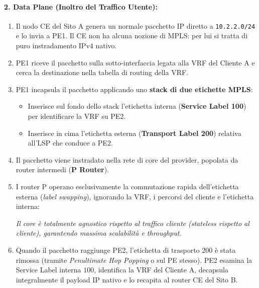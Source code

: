 \documentclass[11pt, a4paper]{article}
\begin{document}
\paragraph{2. Data Plane (Inoltro del Traffico Utente):}
\begin{enumerate}
    \item Il nodo CE del Sito A genera un normale pacchetto IP diretto a \texttt{10.2.2.0/24} e lo invia a PE1. Il CE non ha alcuna nozione di MPLS: per lui si tratta di puro instradamento IPv4 nativo.
    \item PE1 riceve il pacchetto sulla sotto-interfaccia legata alla VRF del Cliente A e cerca la destinazione nella tabella di routing della VRF.
    \item PE1 incapsula il pacchetto applicando uno \textbf{stack di due etichette MPLS}:
    \begin{itemize}[noitemsep]
        \item Inserisce sul fondo dello stack l'etichetta interna (\textbf{Service Label 100}) per identificare la VRF su PE2.
        \item Inserisce in cima l'etichetta esterna (\textbf{Transport Label 200}) relativa all'LSP che conduce a PE2.
    \end{itemize}
    \item Il pacchetto viene instradato nella rete di core del provider, popolata da router intermedi (\textbf{P Router}).
    \item I router P operano esclusivamente la commutazione rapida dell'etichetta esterna (\emph{label swapping}), ignorando la VRF, i percorsi del cliente e l'etichetta interna:
    \begin{center}
        \emph{Il core è totalmente agnostico rispetto al traffico cliente (\emph{stateless rispetto al cliente}), garantendo massima scalabilità e throughput.}
    \end{center}
    \item Quando il pacchetto raggiunge PE2, l'etichetta di trasporto $200$ è stata rimossa (tramite \emph{Penultimate Hop Popping} o sul PE stesso). PE2 esamina la Service Label interna $100$, identifica la VRF del Cliente A, decapsula integralmente il payload IP nativo e lo recapita al router CE del Sito B.
\end{enumerate}

\end{document}
